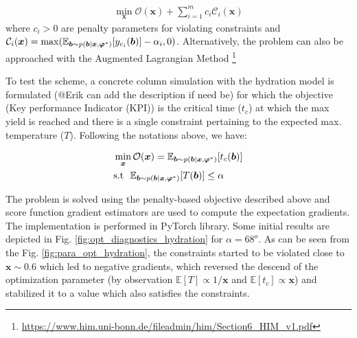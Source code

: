 \documentclass[a4paper,11pt]{article}
\begin{document}
\begin{align}
	\min_{\bm x} \mathcal{O}(\bm x) + \sum_{i=1}^{m}c_i \mathcal{C}_i(\bm x)
\end{align}
where $c_i>0$ are penalty parameters for violating constraints and $\mathcal{C}_{i}(\bm x) = \max (\mathbb{E}_{\bm b\sim p(\bm b | \bm x, \bm {\varphi}^*)}[y_{c_i}(\bm b)] - \alpha_i,0)$. Alternatively, the problem can also  be approached with the Augmented Lagrangian Method \footnote{\href{https://www.him.uni-bonn.de/fileadmin/him/Section6\_HIM\_v1.pdf}{https://www.him.uni-bonn.de/fileadmin/him/Section6\_HIM\_v1.pdf}}

To test the scheme, a concrete column simulation with the hydration model is formulated \cite{} (@Erik can add the description if need be) for which the objective (Key performance Indicator (KPI)) is the critical time ($t_c$) at which the max yield is reached and there is a single constraint pertaining to the expected  max. temperature ($T$). %
Following the notations above, we have:

\begin{align}
&\min_{\bm x} \mathcal{O}(\bm x)= \mathbb{E}_{\bm b\sim p(\bm b | \bm x, \bm {\varphi}^*)}[t_c(\bm b)]\\
&\text{s.t} ~~ \mathbb{E}_{\bm b\sim p(\bm b | \bm x, \bm {\varphi}^*)}[T(\bm b)] \leq \alpha
\end{align}

The problem is solved using the  penalty-based objective described above and score function gradient estimators \cite{schulman_gradient_2016} are used to compute the expectation gradients. The implementation is performed in PyTorch library.
Some initial results are depicted in Fig. \ref{fig:opt_diagnostics_hydration} for $\alpha = 68^o$. As can be seen from the Fig. \ref{fig:para_opt_hydration}, the constraints started to be violated close to $\bm x \sim 0.6$ which led to negative gradients, which reversed the descend of the optimization parameter (by observation $\mathbb{E}[T] \propto 1/\bm{x}$ and $\mathbb{E}[t_c] \propto \bm{x}$) and stabilized it to a value which also satisfies the constraints.
\end{document}
